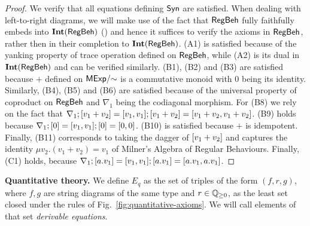 \begin{proof}
	We verify that all equations defining $\mathsf{Syn}$ are satisfied. When dealing with left-to-right diagrams, we will make use of the fact that $\mathsf{RegBeh}$ fully faithfully embeds into $\mathbf{Int}(\mathsf{RegBeh})$ () and hence it suffices to verify the axioms in $\mathsf{RegBeh}$, rather then in their completion to $\mathbf{Int}(\mathsf{RegBeh})$. \textsf{(A1)} is satisfied because of the yanking property of trace operation defined on $\mathsf{RegBeh}$, while \textsf{(A2)} is its dual in $\mathbf{Int}(\mathsf{RegBeh})$ and can be verified similarly. \textsf{(B1)}, \textsf{(B2)} and \textsf{(B3)} are satisfied because $+$ defined on ${\mathsf{MExp}}/{\sim}$ is a commutative monoid with $0$ being its identity. Similarly, \textsf{(B4)}, \textsf{(B5)} and \textsf{(B6)} are satisfied because of the universal property of coproduct on $\mathsf{RegBeh}$ and $\nabla_1$ being the codiagonal morphism. For \textsf{(B8)} we rely on the fact that $\nabla_1 ; [ v_1 + v_2 ] = [ v_1, v_1] ; [ v_1 + v_2 ] = [ v_1 + v_2, v_1 + v_2 ]$. \textsf{(B9)} holds because $\nabla_1 ; [  0]= [ v_1, v_1] ; [ 0 ] = [ 0, 0 ] $. 
	\textsf{(B10)} is satisfied because $+$ is idempotent. Finally, \textsf{(B11)} corresponds to taking the dagger of $[ v_1 + v_2 ]$ and captures the identity $\mu v_2.(v_1 + v_2) = v_1$ of Milner's Algebra of Regular Behaviours. Finally, \textsf{(C1)} holds, because $\nabla_1 ; [ a . v_1 ] = [ v_1, v_1 ] ; [ a. v_1 ] = [ a. v_1, a.v_1]$.
\end{proof}
\noindent
\textbf{Quantitative theory. } We define $E_q$ as the set of triples of the form $(f, r, g)$, where $f,g$ are string diagrams of the same type and $r \in \mathbb{Q}_{\geq 0}$, as the least set closed under the rules of Fig.~\ref{fig:quantitative-axioms}. We will call elements of that set \emph{derivable equations}. 
